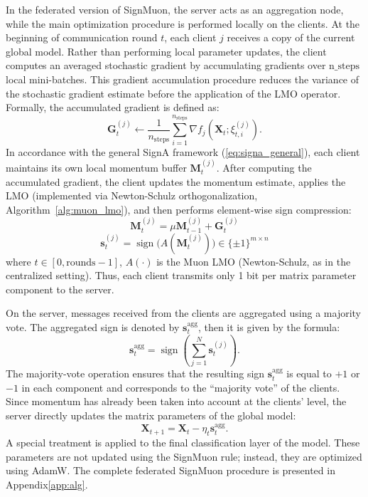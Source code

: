 \documentclass[letterpaper]{article} %
\begin{document}
In the federated version of SignMuon, the server acts as an aggregation node, while the main optimization procedure is performed locally on the clients. At the beginning of communication round $t$, each client $j$ receives a copy of the current global model. Rather than performing local parameter updates, the client computes an averaged stochastic gradient by accumulating gradients over $\mathrm{n\_steps}$ local mini-batches. This gradient accumulation procedure reduces the variance of the stochastic gradient estimate before the application of the LMO operator. Formally, the accumulated gradient is defined as:
$$
\mathbf{G}_t^{(j)}\gets\frac{1}{n_{\text{steps}}}\sum_{i=1}^{n_{\text{steps}}}\nabla f_j(\mathbf{X}_t;\xi_{t,i}^{(j)}).
$$
In accordance with the general SignA framework (\ref{eq:signa_general}), each client maintains its own local momentum buffer $\mathbf{M}_t^{(j)}$. After computing the accumulated gradient, the client updates the momentum estimate, applies the LMO (implemented via Newton-Schulz orthogonalization, Algorithm~\ref{alg:muon_lmo}), and then performs element-wise sign compression:
$$ \mathbf{M}_t^{(j)} = \mu \mathbf{M}_{t-1}^{(j)} + \mathbf{G}_t^{(j)} $$
$$ \mathbf{s}_t^{(j)} = \operatorname{sign}\bigl(A(\mathbf{M}_t^{(j)})\bigr) \in \{\pm 1\}^{m \times n} $$
where $t\in[0, \mathrm{rounds}-1]$, $A(\cdot)$ is the Muon LMO (Newton-Schulz, as in the centralized setting). Thus, each client transmits only 1 bit per matrix parameter component to the server.

On the server, messages received from the clients are aggregated using a majority vote. The aggregated sign is denoted by $\mathbf{s}_t^{\mathrm{agg}}$, then it is given by the formula:
\begin{equation}
\mathbf{s}_t^{\mathrm{agg}}=\operatorname{sign}\!\left(\sum_{j=1}^N \mathbf{s}_t^{(j)}\right).
\end{equation}
The majority-vote operation ensures that the resulting sign $\mathbf{s}_t^{\mathrm{agg}}$ is equal to $+1$ or $-1$ in each component and corresponds to the “majority vote” of the clients. Since momentum has already been taken into account at the clients' level, the server directly updates the matrix parameters of the global model:
\[
\mathbf{X}_{t+1} = \mathbf{X}_t - \eta_t \mathbf{s}_t^{\mathrm{agg}}.
\]
A special treatment is applied to the final classification layer of the model. These parameters are not updated using the SignMuon rule; instead, they are optimized using AdamW. The complete federated SignMuon procedure is presented in Appendix\ref{app:alg}.
\end{document}
